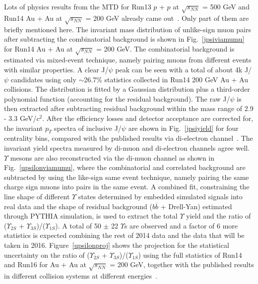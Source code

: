 Lots of physics results from the MTD for Run13 $p$ + $p$ at $\sqrt{s_{NN}}$ = 500 GeV and Run14 Au + Au at $\sqrt{s_{NN}}$ = 200 GeV already came out~\cite{MTDResultpp500, MTDResultAuAu200}. Only part of them are briefly mentioned here. The invariant mass distribution of unlike-sign muon pairs after subtracting the combinatorial background is shown in Fig.~\ref{jpsiviamumu} for Run14 Au + Au at $\sqrt{s_{NN}}$ = 200 GeV. The combinatorial background is estimated via mixed-event technique, namely pairing muons from different events with similar properties. A clear J/$\psi$ peak can be seen with a total of about 4k J/$\psi$ candidates using only $\sim$26.7\% statistics collected in Run14 200 GeV Au + Au collisions. The distribution is fitted by a Gaussian distribution plus a third-order polynomial function (accounting for the residual background). The raw J/$\psi$ is then extracted after subtracting residual background within the mass range of 2.9 - 3.3 GeV/$c^{2}$. After the efficiency losses and detector acceptance are corrected for, the invariant $p_{T}$ spectra of inclusive J/$\psi$ are shown in Fig.~\ref{jpsiyield} for four centrality bins, compared with the published results via di-electron channel~\cite{JpsiViaee0, JpsiViaee1}. The invariant yield spectra measured by di-muon and di-electron channels agree well. $\varUpsilon$ mesons are also reconstructed via the di-muon channel as shown in Fig.~\ref{upsilonviamumu}, where the combinatorial and correlated background are subtracted by using the like-sign same event technique, namely pairing the same charge sign muons into pairs in the same event. A combined fit, constraining the line shape of different $\varUpsilon$ states determined by embedded simulated signals into real data and the shape of residual background ($b\overline{b}$ + Drell-Yan) estimated through PYTHIA simulation, is used to extract the total $\varUpsilon$ yield and the ratio of ($\varUpsilon_{2S}$ + $\varUpsilon_{3S}$)/($\varUpsilon_{1S}$). A total of 50 $\pm$ 22 $\varUpsilon$s are observed and a factor of 6 more statistics is expected combining the rest of 2014 data and the data that will be taken in 2016. Figure~\ref{upsilonproj} shows the projection for the statistical uncertainty on the ratio of ($\varUpsilon_{2S}$ + $\varUpsilon_{3S}$)/($\varUpsilon_{1S}$) using the full statistics of Run14 and Run16 for Au + Au at $\sqrt{s_{NN}}$ = 200 GeV, together with the published results in different collision systems at different energies~\cite{UpsilonWorldwide, UpsilonSTAR, UpsilonCMS}.

